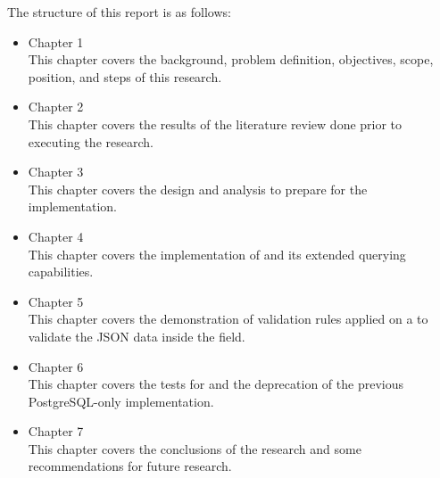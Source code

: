 The structure of this report is as follows:

\begin{itemize}
    \item Chapter 1 \babSatu \\
        This chapter covers the background, problem definition, objectives,
        scope, position, and steps of this research.
    \item Chapter 2 \babDua \\
        This chapter covers the results of the literature review done prior to
        executing the research.
    \item Chapter 3 \babTiga \\
        This chapter covers the design and analysis to prepare for the
        implementation.
    \item Chapter 4 \babEmpat \\
        This chapter covers the implementation of  and its
        extended querying capabilities.
    \item Chapter 5 \babLima \\
        This chapter covers the demonstration of validation rules applied on
        a  to validate the JSON data inside the field.
    \item Chapter 6 \babEnam \\
        This chapter covers the tests for  and the deprecation
        of the previous PostgreSQL-only implementation.
    \item Chapter 7 \kesimpulan \\
        This chapter covers the conclusions of the research and some
        recommendations for future research.
\end{itemize}
